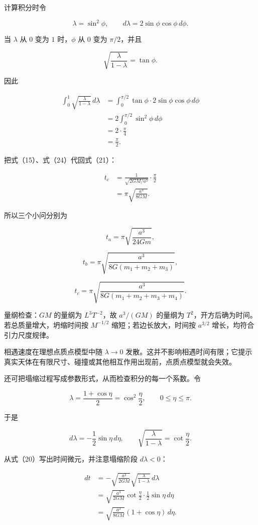 \documentclass[12pt,a4paper,UTF8]{ctexart}
\begin{document}
计算积分时令

\[
\lambda=\sin^2\phi,
\qquad
d\lambda=2\sin\phi\cos\phi\,d\phi. \tag{22}
\]

当 \(\lambda\) 从 \(0\) 变为 \(1\) 时，\(\phi\) 从 \(0\) 变为
\(\pi/2\)，并且

\[
\sqrt{\frac{\lambda}{1-\lambda}}=\tan\phi. \tag{23}
\]

因此

\[
\begin{aligned}
\int_0^1\sqrt{\frac{\lambda}{1-\lambda}}\,d\lambda
&=\int_0^{\pi/2}
  \tan\phi\cdot2\sin\phi\cos\phi\,d\phi\\
&=2\int_0^{\pi/2}\sin^2\phi\,d\phi\\
&=2\cdot\frac\pi4\\
&=\frac\pi2.
\end{aligned} \tag{24}
\]

把式（15）、式（24）代回式（21）：

\[
\begin{aligned}
t_c
&=\frac1{\sqrt{2GM/a^3}}\cdot\frac\pi2\\
&=\pi\sqrt{\frac{a^3}{8GM}}.
\end{aligned} \tag{25}
\]

所以三个小问分别为

\[
\boxed{
t_a=\pi\sqrt{\frac{a^3}{24Gm}}
}, \tag{26}
\]

\[
\boxed{
t_b=\pi\sqrt{\frac{a^3}{8G(m_1+m_2+m_3)}}
}, \tag{27}
\]

\[
\boxed{
t_c=\pi\sqrt{\frac{a^3}{8G(m_1+m_2+m_3+m_4)}}
}. \tag{28}
\]

量纲检查：\(G M\) 的量纲为 \(L^3T^{-2}\)，故 \(a^3/(GM)\) 的量纲为
\(T^2\)，开方后确为时间。若总质量增大，坍缩时间按 \(M^{-1/2}\)
缩短；若边长放大，时间按 \(a^{3/2}\) 增长，均符合引力尺度规律。

相遇速度在理想点质点模型中随 \(\lambda\to0\)
发散。这并不影响相遇时间有限；它提示真实天体在有限尺寸、碰撞或其他相互作用出现前，点质点模型就会失效。

还可把塌缩过程写成参数形式，从而检查积分的每一个系数。令

\[
\lambda=\frac{1+\cos\eta}{2}
=\cos^2\frac\eta2,
\qquad 0\leqslant\eta\leqslant\pi. \tag{29}
\]

于是

\[
d\lambda=-\frac12\sin\eta\,d\eta,
\qquad
\sqrt{\frac{\lambda}{1-\lambda}}=\cot\frac\eta2. \tag{30}
\]

从式（20）写出时间微元，并注意塌缩阶段 \(d\lambda<0\)：

\[
\begin{aligned}
dt
&=-\sqrt{\frac{a^3}{2GM}}
\sqrt{\frac{\lambda}{1-\lambda}}\,d\lambda\\
&=\sqrt{\frac{a^3}{2GM}}
\cot\frac\eta2\cdot\frac12\sin\eta\,d\eta\\
&=\sqrt{\frac{a^3}{8GM}}(1+\cos\eta)\,d\eta.
\end{aligned} \tag{31}
\]
\end{document}
